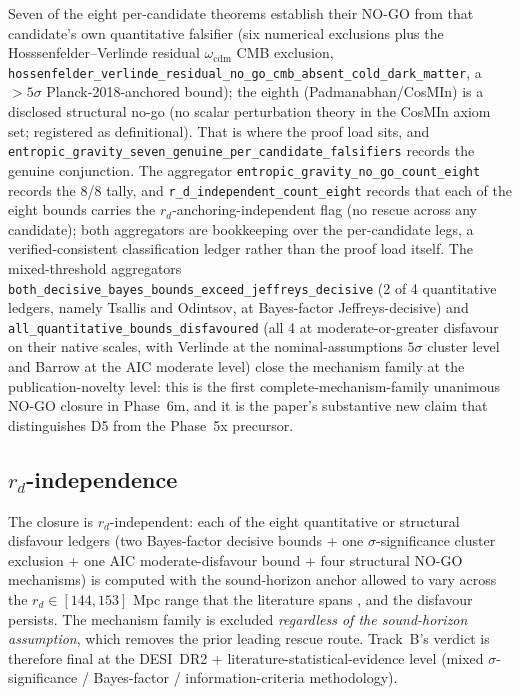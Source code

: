 \documentclass[aps,prd,reprint,nofootinbib,superscriptaddress]{revtex4-2}
\begin{document}
Seven of the eight per-candidate theorems establish their NO-GO from
that candidate's own quantitative falsifier (six numerical exclusions
plus the Hosssenfelder--Verlinde residual $\omega_{\mathrm{cdm}}$ CMB
exclusion, \texttt{hossenfelder\_verlinde\_residual\_no\_go\_cmb\_absent\_cold\_dark\_matter},
a $>5\sigma$ Planck-2018-anchored bound); the eighth
(Padmanabhan/CosMIn) is a disclosed structural no-go (no scalar
perturbation theory in the CosMIn axiom set; registered as
definitional). That is where the proof load sits, and
\texttt{entropic\_gravity\_seven\_genuine\_per\_candidate\_falsifiers}
records the genuine conjunction. The aggregator \texttt{entropic\_gravity\_no\_go\_count\_eight}
records the 8/8 tally, and \texttt{r\_d\_independent\_count\_eight}
records that each of the eight bounds carries the $r_d$-anchoring-independent
flag (no rescue across any candidate); both aggregators are bookkeeping
over the per-candidate legs, a verified-consistent classification ledger
rather than the proof load itself. The mixed-threshold aggregators
\texttt{both\_decisive\_bayes\_bounds\_exceed\_jeffreys\_decisive}
(2 of 4 quantitative ledgers, namely Tsallis and Odintsov, at
Bayes-factor Jeffreys-decisive) and
\texttt{all\_quantitative\_bounds\_disfavoured} (all 4 at moderate-or-greater
disfavour on their native scales, with Verlinde at the nominal-assumptions
$5\sigma$ cluster level and Barrow at the AIC moderate level) close the mechanism
family at the publication-novelty level: this is the first
complete-mechanism-family unanimous NO-GO closure in Phase~6m, and it
is the paper's substantive new claim that distinguishes D5 from the
Phase~5x precursor.

\subsection{$r_d$-independence}
\label{subsec:phase6m-track-b-rd-independence}

The closure is $r_d$-independent: each of the eight quantitative or
structural disfavour ledgers (two Bayes-factor decisive bounds + one
$\sigma$-significance cluster exclusion + one
AIC moderate-disfavour bound + four structural NO-GO mechanisms) is
computed with the sound-horizon anchor allowed to vary across the
$r_d \in [144, 153]$ Mpc range that the literature spans
\cite{ParkRatra2025rd,WangYinTension2025rd}, and the
disfavour persists. The mechanism family is excluded
\emph{regardless of the sound-horizon assumption}, which removes the
prior leading rescue route. Track~B's verdict is therefore final at the
DESI~DR2 + literature-statistical-evidence level (mixed
$\sigma$-significance / Bayes-factor / information-criteria
methodology).
\end{document}
